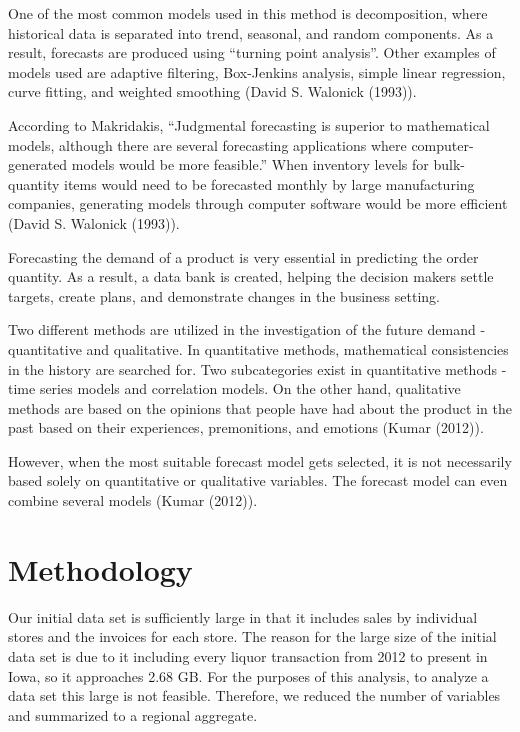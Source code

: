 \documentclass[]{elsarticle} %
\begin{document}
One of the most common models used in this method is decomposition,
where historical data is separated into trend, seasonal, and random
components. As a result, forecasts are produced using ``turning point
analysis''. Other examples of models used are adaptive filtering,
Box-Jenkins analysis, simple linear regression, curve fitting, and
weighted smoothing (David S. Walonick (1993)).

According to Makridakis, ``Judgmental forecasting is superior to
mathematical models, although there are several forecasting applications
where computer-generated models would be more feasible.'' When inventory
levels for bulk-quantity items would need to be forecasted monthly by
large manufacturing companies, generating models through computer
software would be more efficient (David S. Walonick (1993)).

Forecasting the demand of a product is very essential in predicting the
order quantity. As a result, a data bank is created, helping the
decision makers settle targets, create plans, and demonstrate changes in
the business setting.

Two different methods are utilized in the investigation of the future
demand - quantitative and qualitative. In quantitative methods,
mathematical consistencies in the history are searched for. Two
subcategories exist in quantitative methods - time series models and
correlation models. On the other hand, qualitative methods are based on
the opinions that people have had about the product in the past based on
their experiences, premonitions, and emotions (Kumar (2012)).

However, when the most suitable forecast model gets selected, it is not
necessarily based solely on quantitative or qualitative variables. The
forecast model can even combine several models (Kumar (2012)).

\section{Methodology}\label{methodology}

Our initial data set is sufficiently large in that it includes sales by
individual stores and the invoices for each store. The reason for the
large size of the initial data set is due to it including every liquor
transaction from 2012 to present in Iowa, so it approaches 2.68 GB. For
the purposes of this analysis, to analyze a data set this large is not
feasible. Therefore, we reduced the number of variables and summarized
to a regional aggregate.
\end{document}

